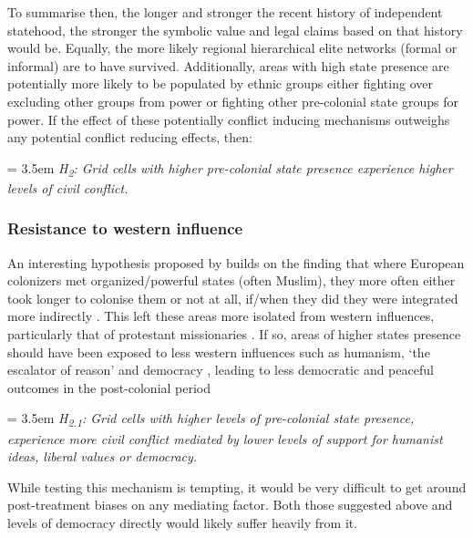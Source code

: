 \documentclass[12pt]{article}
\begin{document}
To summarise then, the longer and stronger the recent history of independent
statehood, the stronger the symbolic value and legal claims based on that
history would be. Equally, the more likely regional hierarchical elite networks
(formal or informal) are to have survived. Additionally, areas with high state
presence are potentially more likely to be populated by ethnic groups either
fighting over excluding other groups from power or fighting other pre-colonial
state groups for power. If the effect of these potentially conflict inducing
mechanisms outweighs any potential conflict reducing effects, then:

\bigskip

\hangindent = 3.5em \textit{H\textsubscript{2}: Grid cells with higher
pre-colonial state presence experience higher levels of civil conflict.}

\bigskip 

\subsubsection{Resistance to western influence}

An interesting hypothesis proposed by \citet{Wishman} builds on the finding that
where European colonizers met organized/powerful states (often Muslim), they
more often either took longer to colonise them or not at all, if/when they did
they were integrated more indirectly \citep{Gerring2011, Hariri2012,
Englebert2000}. This left these areas more isolated from western influences,
particularly that of protestant missionaries \citep{Woodberry2012}. If so, areas
of higher states presence should have been exposed to less western influences
such as humanism, `the escalator of reason' \citep{Pinker2012} and democracy
\citep{Woodberry2012, Hariri2012}, leading to less democratic and peaceful
outcomes in the post-colonial period \citep{Hegre2006}

\bigskip

\hangindent = 3.5em \textit{H\textsubscript{2.1}: Grid cells with higher levels
of pre-colonial state presence, experience more civil conflict mediated by lower
levels of support for humanist ideas, liberal values or democracy.}


\bigskip

While testing this mechanism is tempting, it would be very difficult to get
around post-treatment biases on any mediating factor. Both those suggested above
and levels of democracy directly would likely suffer heavily from it.
\end{document}
